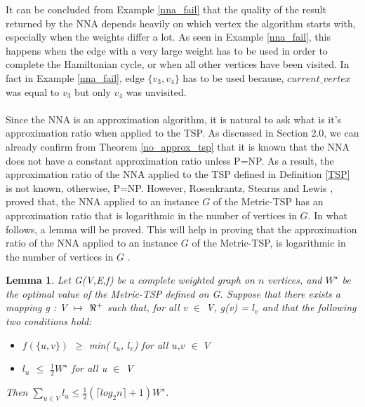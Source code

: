 \documentclass[12pt]{article}
\newtheorem{lemma}[definition]{Lemma}
\numberwithin{equation}{subsection}
\numberwithin{table}{subsection}
\begin{document}
It can be concluded from Example \ref{nna_fail} that the quality of the result returned by the NNA depends heavily on which vertex the algorithm starts with, especially when the weights differ a lot. As seen in Example \ref{nna_fail}, this happens when the edge with a very large weight has to be used in order to complete the Hamiltonian cycle, or when all other vertices have been visited. In fact in Example \ref{nna_fail}, edge $\{v_3, v_4\}$ has to be used because, $current\_vertex$ was equal to $v_3$ but only $v_4$ was unvisited.\\\\
Since the NNA is an approximation algorithm, it is natural to ask what is it's approximation ratio when applied to the TSP. As discussed in Section 2.0, we can already confirm from Theorem \ref{no_approx_tsp} that it is known that the NNA does not have a constant approximation ratio unless P=NP. As a result, the approximation ratio of the NNA applied to the TSP defined in Definition \ref{TSP} is not known, otherwise, P=NP. However, Rosenkrantz, Stearns and Lewis \cite{Rosenkrantz}, proved that, the NNA applied to an instance $G$ of the Metric-TSP has an approximation ratio that is logarithmic in the number of vertices in $G$. In what follows, a lemma will be proved. This will help in proving that the approximation ratio of the NNA applied to an instance $G$ of the Metric-TSP, is logarithmic in the number of vertices in $G$ . 
\begin{lemma}
\label{to_proove_bound}
Let G(V,E,f) be a complete weighted graph on $n$ vertices, and $W^\star$ be the optimal value of the Metric-TSP defined on G. Suppose that there exists a mapping g : V $\mapsto$ $\real^+$ such that, for all v $\in$ V, g(v) = $l_v$ and that the following  two conditions hold:
\begin{itemize}
\item $f(\{u, v\})$ $\geq$ min( $l_u$, $l_v$) for all $u$,$v$ $\in$ $V$
\item $l_u$ $\leq$ $\frac{1}{2}W^\star$ for all u $\in$ V
\end{itemize}
Then $\sum_{u \in V} l_u \leq \frac{1}{2}(\lceil log_2 n \rceil + 1)W^\star$. {}
\end{lemma}
\end{document}
